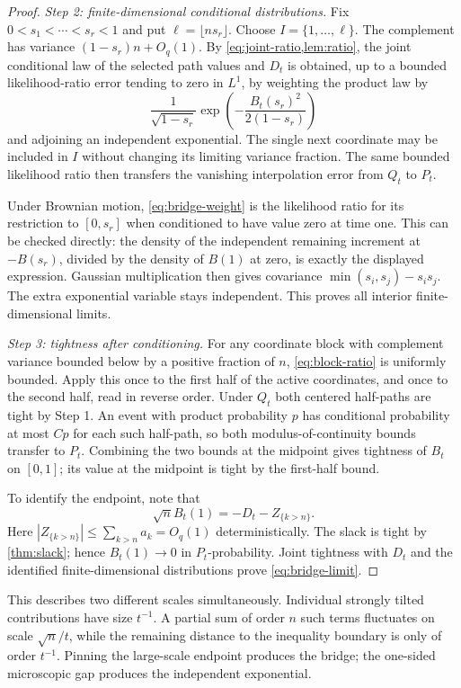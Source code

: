 \documentclass[11pt,a4paper]{article}
\numberwithin{equation}{section}
\theoremstyle{definition}
\theoremstyle{remark}
\begin{document}
\begin{proof}
\textit{Step 2: finite-dimensional conditional distributions.}
Fix $0<s_1<\cdots<s_r<1$ and put $\ell=\lfloor ns_r\rfloor$.
Choose $I=\{1,\ldots,\ell\}$. The complement has variance
$(1-s_r)n+O_q(1)$. By \cref{eq:joint-ratio,lem:ratio}, the joint
conditional law of the selected path values and $D_t$ is obtained,
up to a bounded likelihood-ratio error tending to zero in $L^1$,
by weighting the product law by
\begin{equation}\label{eq:bridge-weight}
 \frac1{\sqrt{1-s_r}}
       \exp\left(-\frac{B_t(s_r)^2}{2(1-s_r)}\right)
\end{equation}
and adjoining an independent exponential. The single next coordinate
may be included in $I$ without changing its limiting variance
fraction. The same bounded likelihood ratio then transfers the
vanishing interpolation error from $Q_t$ to $P_t$.

Under Brownian motion, \cref{eq:bridge-weight} is the likelihood
ratio for its restriction to $[0,s_r]$ when conditioned to have
value zero at time one. This can be checked directly: the density
of the independent remaining increment at $-B(s_r)$, divided by
the density of $B(1)$ at zero, is exactly the displayed expression.
Gaussian multiplication then gives covariance
$\min(s_i,s_j)-s_is_j$. The extra exponential variable stays
independent. This proves all interior finite-dimensional limits.

\textit{Step 3: tightness after conditioning.}
For any coordinate block with complement variance bounded below by
a positive fraction of $n$, \cref{eq:block-ratio} is uniformly
bounded. Apply this once to the first half of the active
coordinates, and once to the second half, read in reverse order.
Under $Q_t$ both centered half-paths are tight by Step 1. An event
with product probability $p$ has conditional probability at most
$Cp$ for each such half-path, so both modulus-of-continuity bounds
transfer to $P_t$. Combining the two bounds at the midpoint gives
tightness of $B_t$ on $[0,1]$; its value at the midpoint is tight
by the first-half bound.

To identify the endpoint, note that
\[
 \sqrt n B_t(1)=-D_t-Z_{\{k>n\}}.
\]
Here $|Z_{\{k>n\}}|\le\sum_{k>n}a_k=O_q(1)$ deterministically.
The slack is tight by \cref{thm:slack}; hence $B_t(1)\to0$ in
$P_t$-probability. Joint tightness with $D_t$ and the identified
finite-dimensional distributions prove \cref{eq:bridge-limit}.
\end{proof}

This describes two different scales simultaneously. Individual
strongly tilted contributions have size $t^{-1}$. A partial sum of
order $n$ such terms fluctuates on scale $\sqrt n/t$, while the
remaining distance to the inequality boundary is only of order
$t^{-1}$. Pinning the large-scale endpoint produces the bridge;
the one-sided microscopic gap produces the independent exponential.
\end{document}
